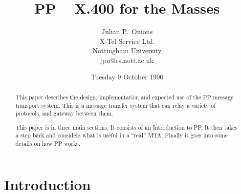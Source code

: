 





\title{PP -- X.400 for the Masses}
\author{Julian P.~Onions\\[0.1in]
X-Tel Service Ltd.\\
Nottingham University\\[0.1in]
jpo@cs.nott.ac.uk}
\date{Tuesday 9 October 1990}

\maketitle

\begin{abstract}
This paper describes the design, implementation and expected use of
the PP message transport system. This is a message transfer system
that can relay a variety of protocols, and gateway between them.

This paper is in three main sections, It consists of an Introduction
to PP. It then takes a step back and considers what is useful in a
``real'' MTA. Finally it goes into some details on how PP works.
\end{abstract}

\section{Introduction}

